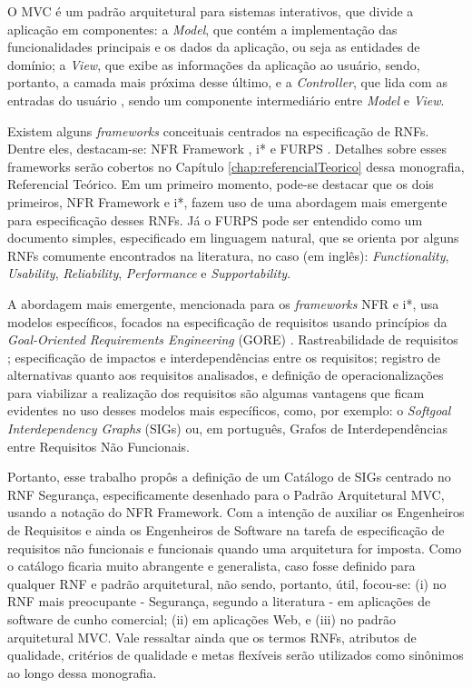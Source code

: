 O MVC é um padrão arquitetural para sistemas interativos, que divide a aplicação em componentes: a \textit{Model}, que contém a implementação das funcionalidades principais e os dados da aplicação, ou seja as entidades de domínio; a \textit{View}, que exibe as informações da aplicação ao usuário, sendo, portanto, a camada mais próxima desse último, e a \textit{Controller}, que lida com as entradas do usuário \cite{buschmann1996system}, sendo um componente intermediário entre \textit{Model} e \textit{View}.  

Existem alguns \textit{frameworks} conceituais centrados na especificação de RNFs. Dentre eles, destacam-se: NFR Framework \cite{chung2009non}, i* \cite{istarwiki20} e FURPS \cite{umar2011analyzing}. Detalhes sobre esses frameworks serão cobertos no Capítulo \ref{chap:referencialTeorico} dessa monografia, Referencial Teórico. Em um primeiro momento, pode-se destacar que os dois primeiros, NFR Framework e i*, fazem uso de uma abordagem mais emergente para especificação desses RNFs. Já o FURPS pode ser entendido como um documento simples, especificado em linguagem natural, que se orienta por alguns RNFs comumente encontrados na literatura, no caso (em inglês): \textit{Functionality}, \textit{Usability}, \textit{Reliability}, \textit{Performance} e \textit{Supportability}.

A abordagem mais emergente, mencionada para os \textit{frameworks} NFR e i*, usa modelos específicos, focados na especificação de requisitos usando princípios da \textit{Goal-Oriented Requirements Engineering} (GORE) \cite{horkoff2016goal}. Rastreabilidade de requisitos \cite{wiegers2013software}; especificação de impactos e interdependências entre os requisitos; registro de alternativas quanto aos requisitos analisados, e definição de operacionalizações para viabilizar a realização dos requisitos são algumas vantagens que ficam evidentes no uso desses modelos mais específicos, como, por exemplo: o \textit{Softgoal Interdependency Graphs} (SIGs) \cite{chung2012non} ou, em português, Grafos de Interdependências entre Requisitos Não Funcionais. 

Portanto, esse trabalho propôs a definição de um Catálogo de SIGs centrado no RNF Segurança, especificamente desenhado para o Padrão Arquitetural MVC, usando a notação do NFR Framework. Com a intenção de auxiliar os Engenheiros de Requisitos e ainda os Engenheiros de Software na tarefa de especificação de requisitos não funcionais e funcionais quando uma arquitetura for imposta. Como o catálogo ficaria muito abrangente e generalista, caso fosse definido para qualquer RNF e padrão arquitetural, não sendo, portanto, útil, focou-se: (i) no RNF mais preocupante - Segurança, segundo a literatura - em aplicações de software de cunho comercial; (ii) em aplicações Web, e (iii) no padrão arquitetural MVC.  Vale ressaltar ainda que os termos RNFs, atributos de qualidade, critérios de qualidade e metas flexíveis serão utilizados como sinônimos ao longo dessa monografia.


